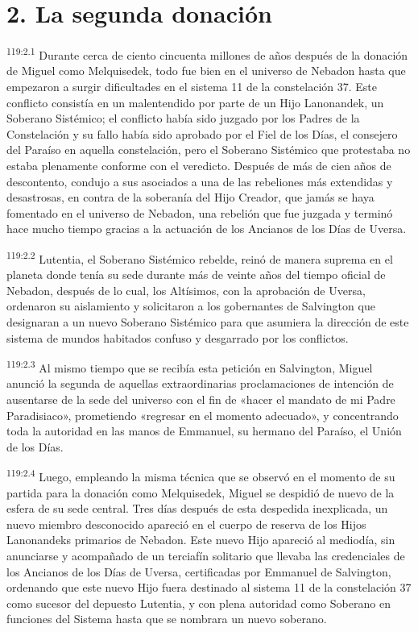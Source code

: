 \section*{2. La segunda donación}
\par
\textsuperscript{119:2.1} Durante cerca de ciento cincuenta millones de años después de la donación de Miguel como Melquisedek, todo fue bien en el universo de Nebadon hasta que empezaron a surgir dificultades en el sistema 11 de la constelación 37. Este conflicto consistía en un malentendido por parte de un Hijo Lanonandek, un Soberano Sistémico; el conflicto había sido juzgado por los Padres de la Constelación y su fallo había sido aprobado por el Fiel de los Días, el consejero del Paraíso en aquella constelación, pero el Soberano Sistémico que protestaba no estaba plenamente conforme con el veredicto. Después de más de cien años de descontento, condujo a sus asociados a una de las rebeliones más extendidas y desastrosas, en contra de la soberanía del Hijo Creador, que jamás se haya fomentado en el universo de Nebadon, una rebelión que fue juzgada y terminó hace mucho tiempo gracias a la actuación de los Ancianos de los Días de Uversa.

\par
\textsuperscript{119:2.2} Lutentia, el Soberano Sistémico rebelde, reinó de manera suprema en el planeta donde tenía su sede durante más de veinte años del tiempo oficial de Nebadon, después de lo cual, los Altísimos, con la aprobación de Uversa, ordenaron su aislamiento y solicitaron a los gobernantes de Salvington que designaran a un nuevo Soberano Sistémico para que asumiera la dirección de este sistema de mundos habitados confuso y desgarrado por los conflictos.

\par
\textsuperscript{119:2.3} Al mismo tiempo que se recibía esta petición en Salvington, Miguel anunció la segunda de aquellas extraordinarias proclamaciones de intención de ausentarse de la sede del universo con el fin de «hacer el mandato de mi Padre Paradisiaco», prometiendo «regresar en el momento adecuado», y concentrando toda la autoridad en las manos de Emmanuel, su hermano del Paraíso, el Unión de los Días.

\par
\textsuperscript{119:2.4} Luego, empleando la misma técnica que se observó en el momento de su partida para la donación como Melquisedek, Miguel se despidió de nuevo de la esfera de su sede central. Tres días después de esta despedida inexplicada, un nuevo miembro desconocido apareció en el cuerpo de reserva de los Hijos Lanonandeks primarios de Nebadon. Este nuevo Hijo apareció al mediodía, sin anunciarse y acompañado de un terciafín solitario que llevaba las credenciales de los Ancianos de los Días de Uversa, certificadas por Emmanuel de Salvington, ordenando que este nuevo Hijo fuera destinado al sistema 11 de la constelación 37 como sucesor del depuesto Lutentia, y con plena autoridad como Soberano en funciones del Sistema hasta que se nombrara un nuevo soberano.

